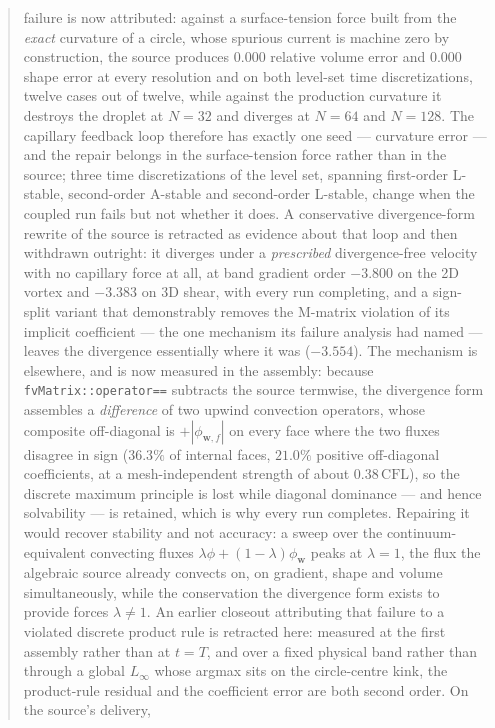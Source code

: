 \documentclass[preprint,3p,11pt]{elsarticle}
\begin{document}
\begin{frontmatter}
\begin{abstract}
failure is now attributed: against a surface-tension force built from the
\emph{exact} curvature of a circle, whose spurious current is machine zero by
construction, the source produces $0.000$ relative volume error and $0.000$ shape
error at every resolution and on both level-set time discretizations, twelve
cases out of twelve, while against the production curvature it destroys the
droplet at $N=32$ and diverges at $N=64$ and $N=128$. The capillary feedback loop
therefore has exactly one seed --- curvature error --- and the repair belongs in
the surface-tension force rather than in the source; three time discretizations
of the level set, spanning first-order L-stable, second-order A-stable and
second-order L-stable, change when the coupled run fails but not whether it does.
A conservative divergence-form rewrite of the source is retracted as evidence
about that loop and then withdrawn outright: it diverges under a \emph{prescribed}
divergence-free velocity with no capillary force at all, at band gradient order
$-3.800$ on the 2D vortex and $-3.383$ on 3D shear, with every run completing, and
a sign-split variant that demonstrably removes the M-matrix violation of its
implicit coefficient --- the one mechanism its failure analysis had named ---
leaves the divergence essentially where it was ($-3.554$). The mechanism is
elsewhere, and is now measured in the assembly: because
\texttt{fvMatrix::operator==} subtracts the source termwise, the divergence form
assembles a \emph{difference} of two upwind convection operators, whose composite
off-diagonal is $+|\phi_{\mathbf{w},f}|$ on every face where the two fluxes
disagree in sign ($36.3\%$ of internal faces, $21.0\%$ positive off-diagonal
coefficients, at a mesh-independent strength of about $0.38\,\mathrm{CFL}$), so the
discrete maximum principle is lost while diagonal dominance --- and hence
solvability --- is retained, which is why every run completes. Repairing it would
recover stability and not accuracy: a sweep over the continuum-equivalent
convecting fluxes $\lambda\phi + (1-\lambda)\phi_{\mathbf{w}}$ peaks at
$\lambda = 1$, the flux the algebraic source already convects on, on gradient,
shape and volume simultaneously, while the conservation the divergence form exists
to provide forces $\lambda \neq 1$. An earlier closeout attributing that failure to
a violated discrete product rule is retracted here: measured at the first assembly
rather than at $t=T$, and over a fixed physical band rather than through a global
$L_\infty$ whose argmax sits on the circle-centre kink, the product-rule residual
and the coefficient error are both second order. On the source's delivery,

\end{abstract}
\end{frontmatter}
\end{document}
